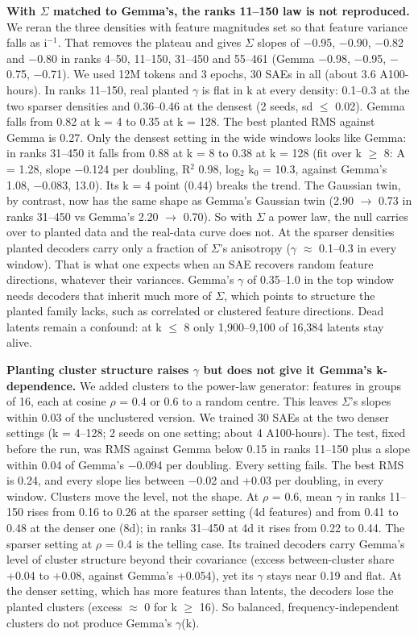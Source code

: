 \documentclass[11pt]{article}
\begin{document}
\textbf{With $\Sigma$ matched to Gemma's, the ranks 11--150 law is not reproduced.} We reran the three densities with feature magnitudes set so that feature variance falls as i$^{-1}$. That removes the plateau and gives $\Sigma$ slopes of $-$0.95, $-$0.90, $-$0.82 and $-$0.80 in ranks 4--50, 11--150, 31--450 and 55--461 (Gemma $-$0.98, $-$0.95, $-$0.75, $-$0.71). We used 12M tokens and 3 epochs, 30 SAEs in all (about 3.6 A100-hours). In ranks 11--150, real planted $\gamma$ is flat in k at every density: 0.1--0.3 at the two sparser densities and 0.36--0.46 at the densest (2 seeds, sd $\le$ 0.02). Gemma falls from 0.82 at k = 4 to 0.35 at k = 128. The best planted RMS against Gemma is 0.27. Only the densest setting in the wide windows looks like Gemma: in ranks 31--450 it falls from 0.88 at k = 8 to 0.38 at k = 128 (fit over k $\ge$ 8: A = 1.28, slope $-$0.124 per doubling, R$^2$ 0.98, log$_2$ k$_0$ = 10.3, against Gemma's 1.08, $-$0.083, 13.0). Its k = 4 point (0.44) breaks the trend. The Gaussian twin, by contrast, now has the same shape as Gemma's Gaussian twin (2.90 $\to$ 0.73 in ranks 31--450 vs Gemma's 2.20 $\to$ 0.70). So with $\Sigma$ a power law, the null carries over to planted data and the real-data curve does not. At the sparser densities planted decoders carry only a fraction of $\Sigma$'s anisotropy ($\gamma$ $\approx$ 0.1--0.3 in every window). That is what one expects when an SAE recovers random feature directions, whatever their variances. Gemma's $\gamma$ of 0.35--1.0 in the top window needs decoders that inherit much more of $\Sigma$, which points to structure the planted family lacks, such as correlated or clustered feature directions. Dead latents remain a confound: at k $\le$ 8 only 1,900--9,100 of 16,384 latents stay alive.

\textbf{Planting cluster structure raises $\gamma$ but does not give it Gemma's k-dependence.} We added clusters to the power-law generator: features in groups of 16, each at cosine $\rho$ = 0.4 or 0.6 to a random centre. This leaves $\Sigma$'s slopes within 0.03 of the unclustered version. We trained 30 SAEs at the two denser settings (k = 4--128; 2 seeds on one setting; about 4 A100-hours). The test, fixed before the run, was RMS against Gemma below 0.15 in ranks 11--150 plus a slope within 0.04 of Gemma's $-$0.094 per doubling. Every setting fails. The best RMS is 0.24, and every slope lies between $-$0.02 and +0.03 per doubling, in every window. Clusters move the level, not the shape. At $\rho$ = 0.6, mean $\gamma$ in ranks 11--150 rises from 0.16 to 0.26 at the sparser setting (4d features) and from 0.41 to 0.48 at the denser one (8d); in ranks 31--450 at 4d it rises from 0.22 to 0.44. The sparser setting at $\rho$ = 0.4 is the telling case. Its trained decoders carry Gemma's level of cluster structure beyond their covariance (excess between-cluster share +0.04 to +0.08, against Gemma's +0.054), yet its $\gamma$ stays near 0.19 and flat. At the denser setting, which has more features than latents, the decoders lose the planted clusters (excess $\approx$ 0 for k $\ge$ 16). So balanced, frequency-independent clusters do not produce Gemma's $\gamma$(k).
\end{document}
